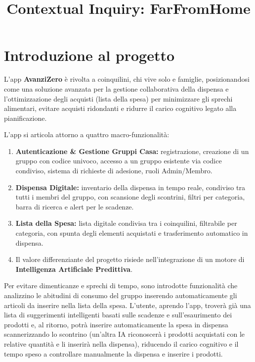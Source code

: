 \documentclass[12pt,a4paper]{article}
\title{Contextual Inquiry: FarFromHome}
\author{}
\date{}
\begin{document}
\maketitle

\section{Introduzione al progetto}
L'app \textbf{AvanziZero} è rivolta a coinquilini, chi vive solo e famiglie, posizionandosi come una soluzione avanzata per la gestione collaborativa della dispensa e l'ottimizzazione degli acquisti (lista della spesa) per minimizzare gli sprechi alimentari, evitare acquisti ridondanti e ridurre il carico cognitivo legato alla pianificazione.

L'app si articola attorno a quattro macro-funzionalità:
\begin{enumerate}
    \item \textbf{Autenticazione \& Gestione Gruppi Casa:} registrazione, creazione di un gruppo con codice univoco, accesso a un gruppo esistente via codice condiviso, sistema di richieste di adesione, ruoli Admin/Membro.
    \item \textbf{Dispensa Digitale:} inventario della dispensa in tempo reale, condiviso tra tutti i membri del gruppo, con scansione degli scontrini, filtri per categoria, barra di ricerca e alert per le scadenze.
    \item \textbf{Lista della Spesa:} lista digitale condivisa tra i coinquilini, filtrabile per categoria, con spunta degli elementi acquistati e trasferimento automatico in dispensa.
    \item Il valore differenziante del progetto risiede nell'integrazione di un motore di \textbf{Intelligenza Artificiale Predittiva}.
\end{enumerate}

Per evitare dimenticanze e sprechi di tempo, sono introdotte funzionalità che analizzino le abitudini di consumo del gruppo inserendo automaticamente gli articoli da inserire nella lista della spesa. L'utente, aprendo l'app, troverà già una lista di suggerimenti intelligenti basati sulle scadenze e sull'esaurimento dei prodotti e, al ritorno, potrà inserire automaticamente la spesa in dispensa scannerizzando lo scontrino (un'altra IA riconoscerà i prodotti acquistati con le relative quantità e li inserirà nella dispensa), riducendo il carico cognitivo e il tempo speso a controllare manualmente la dispensa e inserire i prodotti.
\end{document}
